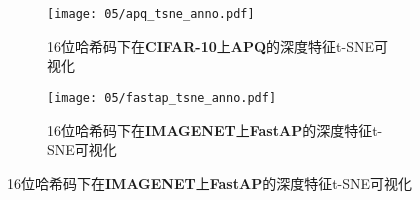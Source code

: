   \begin{figure}[!htp]
    \centering
    \begin{subfigure}{\textwidth}
      \centering
      \texttt{[image: 05/apq\_tsne\_anno.pdf]}
      \caption{16位哈希码下在\textbf{CIFAR-10}上\textbf{APQ}的深度特征t-SNE可视化}
    \end{subfigure}
    \hspace{1cm}
    \begin{subfigure}{\textwidth}
      \centering
      \texttt{[image: 05/fastap\_tsne\_anno.pdf]}
      \caption{16位哈希码下在\textbf{IMAGENET}上\textbf{FastAP}的深度特征t-SNE可视化}
    \end{subfigure}
    \label{fig:abapfast1}
  \end{figure}
